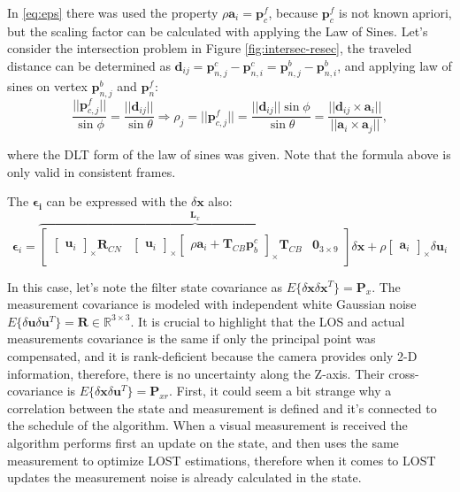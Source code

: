 In \eqref{eq:eps} there was used the property $\rho\mathbf{a}_i = \mathbf{p}_c^f$, because $\mathbf{p}_c^f$ is not known apriori, but the scaling factor can be calculated with applying the Law of Sines. Let's consider the intersection problem in Figure \ref{fig:intersec-resec}, the traveled distance can be determined as $\mathbf{d}_{ij}=\mathbf{p}_{n,j}^c-\mathbf{p}_{n, i}^c = \mathbf{p}_{n,j}^b-\mathbf{p}_{n, i}^b$, and applying law of sines on vertex $\mathbf{p}_{n,j}^b$ and $\mathbf{p}_n^f$:
\begin{equation}
    \frac{||\mathbf{p}_{c,j}^f||}{\sin\phi}=\frac{||\mathbf{d}_{ij}||}{\sin\theta}\Rightarrow \rho_j=||\mathbf{p}_{c,j}^f||=\frac{||\mathbf{d}_{ij}||\sin\phi}{\sin\theta} =
    \frac{||\mathbf{d}_{ij}\times\mathbf{a}_i||}{||\mathbf{a}_i\times\mathbf{a}_j||},
\end{equation}

where the DLT form of the law of sines was given. Note that the formula above is only valid in consistent frames.

The $\boldsymbol{\epsilon_i}$ can be expressed with the $\delta\mathbf{x}$ also:
\begin{equation}
    \boldsymbol{\epsilon}_i = 
    \overbrace{
    \begin{bmatrix}
        \begin{bmatrix}
            \mathbf{u}_i
        \end{bmatrix}_\times\mathbf{R}_{CN} &
        \begin{bmatrix}
            \mathbf{u}_i
        \end{bmatrix}_\times
        \begin{bmatrix}
            \rho\mathbf{a}_i+\mathbf{T}_{CB}\mathbf{p}_b^c
        \end{bmatrix}_\times
        \mathbf{T}_{CB} &
        \mathbf{0}_{3\times 9}
    \end{bmatrix}}^{\mathbf{L}_x}
    \delta\mathbf{x} +
    \rho\begin{bmatrix}
        \mathbf{a}_i
    \end{bmatrix}_\times
    \delta\mathbf{u}_i
    \label{eq:epsilon}
\end{equation}

In this case, let's note the filter state covariance as $E\{\delta\mathbf{x}\delta\mathbf{x}^T\}=\mathbf{P}_x$. The measurement covariance is modeled with independent white Gaussian noise $E\{\delta\mathbf{u}\delta\mathbf{u}^T\}=\mathbf{R}\in\mathbb{R}^{3\times 3}$. It is crucial to highlight that the LOS and actual measurements covariance is the same if only the principal point was compensated, and it is rank-deficient because the camera provides only 2-D information, therefore, there is no uncertainty along the Z-axis. Their cross-covariance is $E\{\delta\mathbf{x}\delta\mathbf{u}^T\}=\mathbf{P}_{xr}$. First, it could seem a bit strange why a correlation between the state and measurement is defined and it's connected to the schedule of the algorithm. When a visual measurement is received the algorithm performs first an update on the state, and then uses the same measurement to optimize LOST estimations, therefore when it comes to LOST updates the measurement noise is already calculated in the state. 

